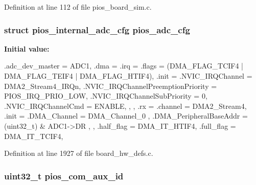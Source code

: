 \-Definition at line 112 of file pios\-\_\-board\-\_\-sim.\-c.

\hypertarget{group___revolution_ga80651408284e662b6dacdf65367ba291}{
\subsubsection[{pios\-\_\-adc\-\_\-cfg}]{\setlength{\rightskip}{0pt plus 5cm}struct {\bf pios\-\_\-internal\-\_\-adc\-\_\-cfg} {\bf pios\-\_\-adc\-\_\-cfg}}}\label{group___revolution_ga80651408284e662b6dacdf65367ba291}
{\bfseries \-Initial value\-:}
\begin{DoxyCode}
 {
        .adc_dev_master = ADC1,
        .dma = {
                .irq = {
                        .flags   = (DMA_FLAG_TCIF4 | DMA_FLAG_TEIF4 | 
      DMA_FLAG_HTIF4),
                        .init    = {
                                .NVIC_IRQChannel                   = 
      DMA2_Stream4_IRQn,
                                .NVIC_IRQChannelPreemptionPriority = 
      PIOS_IRQ_PRIO_LOW,
                                .NVIC_IRQChannelSubPriority        = 0,
                                .NVIC_IRQChannelCmd                = ENABLE,
                        },
                },
                .rx = {
                        .channel = DMA2_Stream4,
                        .init    = {
                                .DMA_Channel                    = DMA_Channel_0
      ,
                                .DMA_PeripheralBaseAddr = (uint32_t) & ADC1->DR
                        },
                }
        },
        .half_flag = DMA_IT_HTIF4,
        .full_flag = DMA_IT_TCIF4,

}
\end{DoxyCode}


\-Definition at line 1927 of file board\-\_\-hw\-\_\-defs.\-c.

\hypertarget{group___revolution_gaa160f7822e620030169c8ac05eee2c36}{
\subsubsection[{pios\-\_\-com\-\_\-aux\-\_\-id}]{\setlength{\rightskip}{0pt plus 5cm}uint32\-\_\-t {\bf pios\-\_\-com\-\_\-aux\-\_\-id}}}\label{group___revolution_gaa160f7822e620030169c8ac05eee2c36}


